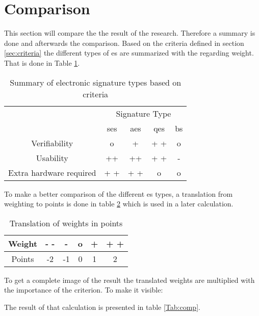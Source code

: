 \section{Comparison} \label{sec:comp}
This section will compare the the result of the research. Therefore a summary is done and afterwards the comparison.
Based on the criteria defined in section \ref{sec:criteria} the different types of \gls{es} are summarized with the regarding weight. That is done in Table \ref{Tab:summary}.

\begin{table}[h]
	\begin{tabular}{|c|c|c|c|c|} \hline
		\rowcolor{Gray}\multirow{2}{*}{Criterion} & \multicolumn{4}{|c|}{Signature Type} \\
								   & \gls{ses} & \gls{aes} & \gls{qes} & \gls{bs} \\ \cline{1-5}
		Verifiability & o & + & + + & o \\ \hline
		Usability & ++ & ++ & + + & - \\ \hline
		Extra hardware required & + + & + + & o & o \\ \hline
	\end{tabular}
	\centering
	\caption{Summary of electronic signature types based on criteria}
	\label{Tab:summary}
\end{table}

To make a better comparison of the different \gls{es} types, a translation from weighting to points is done in table \ref{Tab:Translation} which is used in a later calculation.

\begin{table}[h]
	\begin{tabular}{|c|c|c|c|c|c|} \hline
		Weight & - - & - & o & + & + + \\ \hline
		Points & -2 & -1 & 0 & 1 & 2 \\ \hline
	\end{tabular}
	\centering
	\caption{Translation of weights in points}
	\label{Tab:Translation}
\end{table}

To get a complete image of the result the translated weights are multiplied with the importance of the criterion. To make it visible: 

\begin{center}
\end{center}
The result of that calculation is presented in table \ref{Tab:comp}.

